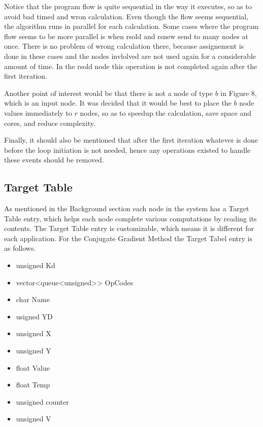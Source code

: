 \documentclass[12pt,a4paper]{article}
\begin{document}
Notice that the program flow is quite sequential in the way it executes, so as to avoid bad timed and wron calculation. Even though the flow seems sequential, the algorithm runs in parallel for each calculation. Some cases where the program flow seems to be more parallel is when rsold and rsnew send to many nodes at once. There is no problem of wrong calculation there, because assignement is done in these cases and the nodes invlolved are not used again for a considerable amount of time. In the rsold node this operation is not completed again after the first iteration.

Another point of interest would be that there is not a node of type $b$ in Figure 8, which is an input node. It was decided that it would be best to place the $b$ node values immediately to $r$ nodes, so as to speedup the calculation, save space and cores, and reduce complexity.

Finally, it should also be mentioned that after the first iteration whatever is done before the loop initiation is not needed, hence any operations existed to handle these events should be removed.
\subsection{Target Table}
As mentioned in the Background section each node in the system has a Target Table entry, which helps each node complete various computations by reading its contents. The Target Table entry is customizable, which means it is different for each application. For the Conjugate Gradient Method the Target Tabel entry is as follows.
\begin{itemize}
\item unsigned Kd
\item vector<queue<unsigned>> OpCodes
\item char Name
\item usigned YD
\item unsigned X
\item unsigned Y
\item float Value
\item float Temp
\item unsigned counter
\item unsigned V
\end{itemize}
\end{document}
